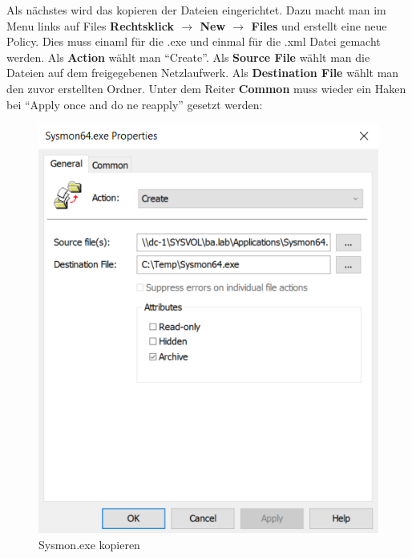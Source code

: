 Als nächstes wird das kopieren der Dateien eingerichtet.
Dazu macht man im Menu links auf Files \textbf{Rechtsklick $\rightarrow$ New $\rightarrow$ Files} und erstellt eine neue Policy.
Dies muss einaml für die .exe und einmal für die .xml Datei gemacht werden.
Als \textbf{Action} wählt man ``Create''.
Als \textbf{Source File} wählt man die Dateien auf dem freigegebenen Netzlaufwerk.
Als \textbf{Destination File} wählt man den zuvor erstellten Ordner.
Unter dem Reiter \textbf{Common} muss wieder ein Haken bei ``Apply once and do ne reapply'' gesetzt werden:\\
\begin{minipage}{0.5\linewidth}
    \begin{figure}[H]
        \centering
        \includegraphics[width=0.7\linewidth]{../img/sysmon/sysmon-file.png}
        \caption{Sysmon.exe kopieren}
    \end{figure}

\end{minipage}
